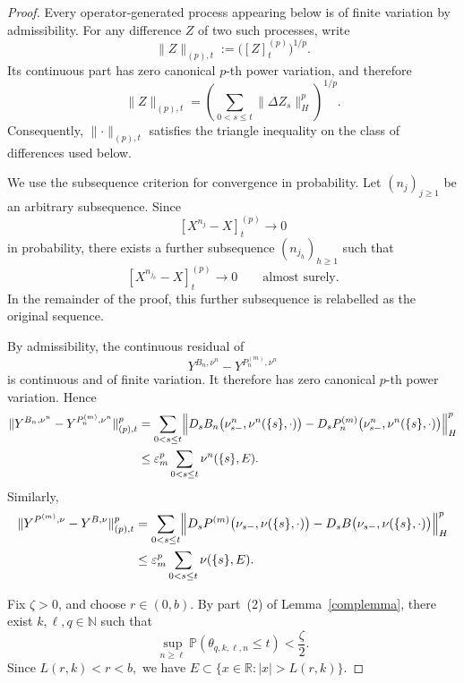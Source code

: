 \documentclass[a4paper,10pt]{article}
\renewcommand{\P}{\mathbb P}
\begin{document}
\begin{proof}
Every operator-generated process appearing below is of finite
variation by admissibility. For any difference \(Z\) of two such
processes, write
\[
        \lVert Z\rVert_{(p),t}
        :=
        \bigl([Z]^{(p)}_t\bigr)^{1/p}.
\]
Its continuous part has zero canonical \(p\)-th power variation, and
therefore
\[
        \lVert Z\rVert_{(p),t}
        =
        \left(
        \sum_{0<s\le t}
        \lVert\Delta Z_s\rVert_H^p
        \right)^{1/p}.
\]
Consequently, \(\lVert\cdot\rVert_{(p),t}\) satisfies the triangle
inequality on the class of differences used below.

We use the subsequence criterion for convergence in probability. Let
\((n_j)_{j\ge1}\) be an arbitrary subsequence. Since
\[
        [X^{n_j}-X]^{(p)}_t
        \longrightarrow0
\]
in probability, there exists a further subsequence
\((n_{j_h})_{h\ge1}\) such that
\[
        [X^{n_{j_h}}-X]^{(p)}_t
        \longrightarrow0
        \qquad\text{almost surely}.
\]
In the remainder of the proof, this further subsequence is relabelled
as the original sequence.

By admissibility, the continuous residual of
\[
        Y^{B_n,\nu^n}-Y^{P_n^{(m)},\nu^n}
\]
is continuous and of finite variation. It therefore has zero canonical
\(p\)-th power variation. Hence
\[
\begin{aligned}
\lVert
Y^{B_n,\nu^n}
-
Y^{P_n^{(m)},\nu^n}
\rVert_{(p),t}^p
&=
\sum_{0<s\le t}
\Bigl\lVert
D_sB_n
\bigl(
        \nu^n_{s-},
        \nu^n(\{s\},\cdot)
\bigr)
-
D_sP_n^{(m)}
\bigl(
        \nu^n_{s-},
        \nu^n(\{s\},\cdot)
\bigr)
\Bigr\rVert_H^p
\\
&\le
\varepsilon_m^p
\sum_{0<s\le t}\nu^n(\{s\},E).
\end{aligned}
\]
Similarly,
\[
\begin{aligned}
\lVert
Y^{P^{(m)},\nu}
-
Y^{B,\nu}
\rVert_{(p),t}^p
&=
\sum_{0<s\le t}
\Bigl\lVert
D_sP^{(m)}
\bigl(
        \nu_{s-},
        \nu(\{s\},\cdot)
\bigr)
-
D_sB
\bigl(
        \nu_{s-},
        \nu(\{s\},\cdot)
\bigr)
\Bigr\rVert_H^p
\\
&\le
\varepsilon_m^p
\sum_{0<s\le t}\nu(\{s\},E).
\end{aligned}
\]

Fix \(\zeta>0\), and choose \(r\in(0,b)\). By part~(2) of Lemma~\ref{complemma}, there exist \(k,\ell,q\in\mathbb N\) such that
\[
        \sup_{n\ge\ell}
        \P(\theta_{q,k,\ell,n}\le t)
        <
        \frac{\zeta}{2}.
\]
Since
$
        L(r,k)<r<b,
$
we have
$
        E
        \subset
        \{x\in\mathbb R:|x|>L(r,k)\}.
$


\end{proof}
\end{document}
